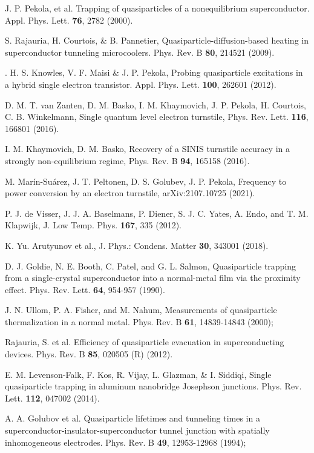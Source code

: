 \documentclass[prx,twocolumn,aps,superscriptaddress,showpacs,amsmath,amssymb,footnoteinbib]{revtex4-1}
\begin{document}
\begin{thebibliography}{99}
J. P. Pekola,  et al. Trapping of quasiparticles of a
nonequilibrium superconductor. Appl. Phys. Lett. \textbf{76}, 2782
(2000).

S. Rajauria, H. Courtois, \& B. Pannetier,
Quasiparticle-diffusion-based heating in superconductor tunneling
microcoolers. Phys. Rev. B \textbf{80}, 214521 (2009).

.
H. S. Knowles,  V. F. Maisi \& J. P. Pekola,  Probing
quasiparticle excitations in a hybrid single electron transistor.
Appl. Phys. Lett. \textbf{100}, 262601 (2012).

D. M. T. van Zanten, D. M. Basko, I. M. Khaymovich, J. P. Pekola, H. Courtois, C. B. Winkelmann,
Single quantum level electron turnstile,
Phys. Rev. Lett. {\bf 116}, 166801 (2016).

I. M. Khaymovich, D. M. Basko,
Recovery of a SINIS turnstile accuracy in a strongly non-equilibrium regime,
Phys. Rev. B {\bf94}, 165158 (2016).

M. Mar{\'i}n-Su{\'a}rez, J. T. Peltonen, D. S. Golubev, J. P. Pekola,
Frequency to power conversion by an electron turnstile,
arXiv:2107.10725 (2021).

P. J. de Visser, J. J. A. Baselmans, P. Diener, S. J. C. Yates, A. Endo, and T. M. Klapwijk,
J. Low Temp. Phys. {\bf 167}, 335 (2012).


K. Yu. Arutyunov et al., J. Phys.: Condens. Matter \textbf{30},
343001 (2018).

D. J. Goldie, N. E. Booth, C. Patel, and G. L. Salmon,
Quasiparticle trapping from a single-crystal superconductor into a
normal-metal film via the proximity effect.
Phys. Rev. Lett. \textbf{64}, 954-957 (1990).

J. N. Ullom, P. A. Fisher, and M. Nahum, Measurements of
quasiparticle thermalization in a normal metal. Phys. Rev. B
\textbf{61}, 14839-14843 (2000); %

Rajauria, S. et al. Efficiency of quasiparticle evacuation in
superconducting devices. Phys. Rev. B \textbf{85}, 020505 (R)
(2012).

E. M. Levenson-Falk, F. Kos, R. Vijay, L. Glazman, \& I. Siddiqi,
Single quasiparticle trapping in aluminum nanobridge Josephson
junctions. Phys. Rev. Lett. \textbf{112}, 047002 (2014).

A. A. Golubov et al. Quasiparticle lifetimes and tunneling times
in a superconductor-insulator-superconductor tunnel junction with
spatially inhomogeneous electrodes. Phys. Rev. B \textbf{49},
12953-12968 (1994); %


\end{thebibliography}
\end{document}
